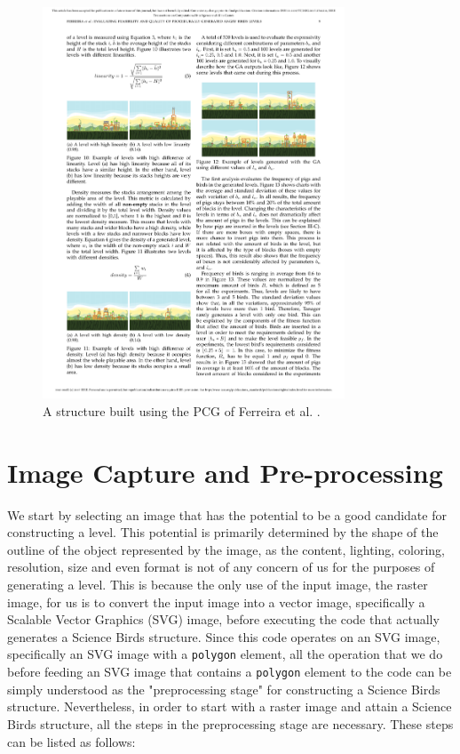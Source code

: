 \documentclass{dalthesis}
\begin{document}
\begin{figure}
\begin{center}
\includegraphics[width=9cm]{./Ferreira2.pdf}
\caption{A structure built using the PCG of Ferreira et al.
\cite{ferreira18}.}
\label{fig:ferreiraEg}
\end{center}
\end{figure}

\chapter{Image Capture and Pre-processing}\label{sec:imagecap}

We start by selecting an image that has the potential to be a good candidate for constructing a level. This potential is primarily determined by the shape of the outline of the object represented by the image, as the content, lighting, coloring, resolution, size and even format is not of any concern of us for the purposes of generating a level. This is because the only use of the input image, the raster image, for us is to convert the input image into a vector image, specifically a Scalable Vector Graphics (SVG) image, before executing the code that actually generates a Science Birds structure. Since this code operates on an SVG image, specifically an SVG image with a \lstinline{polygon} element, all the operation that we do before feeding an SVG image that contains a \lstinline{polygon} element to the code can be simply understood as the "preprocessing stage" for constructing a Science Birds structure. Nevertheless, in order to start with a raster image and attain a Science Birds structure, all the steps in the preprocessing stage are necessary. These steps can be listed as follows:
\end{document}
